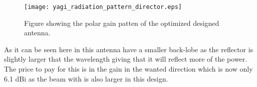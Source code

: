 
\begin{figure}[!h]
  \centering
  \texttt{[image: yagi\_radiation\_pattern\_director.eps]}
  \caption{Figure showing the polar gain patten of the optimized designed antenna.}
  \label{fig:3_element_yagi-uda_pol_pattern_2}
\end{figure}
\FloatBarrier

As it can be seen here in  this antenna have a smaller back-lobe as the reflector is slightly larger that the wavelength giving that it will reflect more of the power. The price to pay for this is in the gain in the wanted direction which is now only 6.1 dBi as the beam with is also larger in this design.